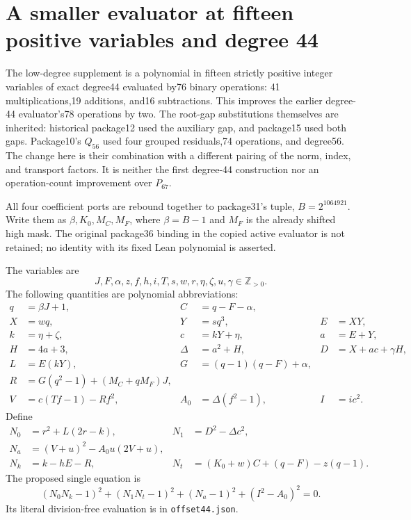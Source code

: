 \section{A smaller evaluator at fifteen positive variables and degree 44}
\label{sec:offset44}

The low-degree supplement is a polynomial in fifteen strictly positive
integer variables of exact degree44 evaluated by76 binary operations:
41 multiplications,19 additions, and16 subtractions. This improves the
earlier degree-44 evaluator's78 operations by two. The root-gap
substitutions themselves are inherited: historical package12 used the
auxiliary gap, and package15 used both gaps. Package10's $Q_{56}$ used
four grouped residuals,74 operations, and degree56. The change here is
their combination with a different pairing of the norm, index, and
transport factors. It is neither the first degree-44 construction nor an
operation-count improvement over $P_{67}$.

All four coefficient ports are rebound together to package31's tuple,
$B=2^{1064921}$. Write them as $\beta,K_0,M_C,M_F$, where $\beta=B-1$
and $M_F$ is the already shifted high mask. The original package36
binding in the copied active evaluator is not retained; no identity with
its fixed Lean polynomial is asserted.

The variables are
\[
 J,F,\alpha,z,f,h,i,T,s,w,r,\eta,\zeta,u,\gamma
 \in\mathbb Z_{>0}.
\]
The following quantities are polynomial abbreviations:
\begin{align*}
q&=\beta J+1,& C&=q-F-\alpha,\\
X&=wq,&Y&=sq^3,&E&=XY,\\
k&=\eta+\zeta,&c&=kY+\eta,&a&=E+Y,\\
H&=4a+3,&\Delta&=a^2+H,&D&=X+ac+\gamma H,\\
L&=E(kY),&G&=(q-1)(q-F)+\alpha,\\
R&=G(q^2-1)+(M_C+qM_F)J,&&\\
V&=c(Tf-1)-Rf^2,&A_0&=\Delta(f^2-1),&I&=ic^2.
\end{align*}
Define
\begin{align*}
N_0&=r^2+L(2r-k),&N_1&=D^2-\Delta c^2,\\
N_a&=(V+u)^2-A_0u(2V+u),&&\\
N_k&=k-hE-R,&N_t&=(K_0+w)C+(q-F)-z(q-1).
\end{align*}
The proposed single equation is
\begin{equation}\label{eq:offset44}
\boxed{(N_0N_k-1)^2+(N_1N_t-1)^2+(N_a-1)^2+(I^2-A_0)^2=0.}
\end{equation}
Its literal division-free evaluation is in \texttt{offset44.json}.

